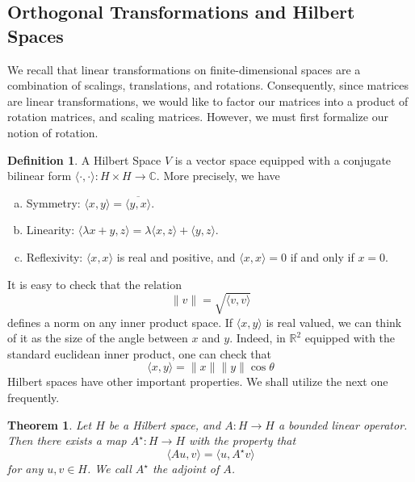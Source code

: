 \documentclass[12pt]{article}
\newcommand{\rr}{\mathbb{R}}
\newcommand{\cc}{\mathbb{C}}
\theoremstyle{plain}
\newtheorem{theorem}{Theorem}
\theoremstyle{definition}
\newtheorem*{definition}{Definition}
\theoremstyle{remark}
\numberwithin{equation}{section}  %
\begin{document}
\subsection{Orthogonal Transformations and Hilbert Spaces}
We recall that linear transformations on finite-dimensional spaces are a combination
of scalings, translations, and rotations. Consequently, since matrices are linear transformations,
we would like to factor our matrices into a product of rotation matrices, and scaling matrices.
However, we must first formalize our notion of rotation. 
\begin{definition}
A Hilbert Space $V$ is a vector space equipped with a conjugate bilinear form 
$ \langle \cdot, \cdot \rangle : H \times H \to \cc $. More precisely, we have
\begin{enumerate}[a)]
\item{Symmetry:} $\langle x,y \rangle  = \overline{ \langle y,x \rangle   }$.
\item{Linearity:} $\langle \lambda x + y, z \rangle  =
\lambda \langle x, z \rangle  + \langle y, z \rangle$.
\item{Reflexivity:} $\langle x, x \rangle  $ is real and positive, 
and $\langle x, x \rangle = 0 $ if and only if $x = 0$.            
\end{enumerate}
\end{definition}
It is easy to check that the relation
\begin{equation*}
\| v \| = \sqrt{\langle v, v \rangle}
\end{equation*}
defines a norm on any inner product space. If $ \langle x, y \rangle $ is real
valued, we can think of it as the size of the angle between $x$
and $y$. Indeed, in $\rr^2$ equipped with the standard euclidean inner product,
one can check that
\begin{equation*}
\langle x, y \rangle  = \|x\| \|y\|\cos \theta
\end{equation*}
Hilbert spaces have other important properties. We shall utilize the next one 
frequently. 

\begin{theorem}
Let $H$ be a Hilbert space, and $A : H \to H$ a bounded linear operator. Then
there exists a map $A^{\star} : H \to H$ with the property that
\begin{equation*}
\langle Au, v \rangle  = \langle u, A^{\star}v \rangle 
\end{equation*}
for any $u, v \in H$. We call $A^{\star}$ the \emph{adjoint} of $A$.
\end{theorem}
\end{document}

